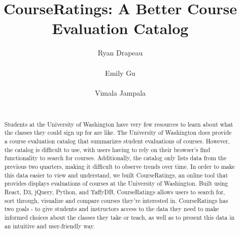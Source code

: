 \documentclass{chi2009}
\begin{document}
\setlength{\paperheight}{11in}
\setlength{\paperwidth}{8.5in}
\setlength{\pdfpageheight}{\paperheight}
\setlength{\pdfpagewidth}{\paperwidth}


\title{CourseRatings: A Better Course Evaluation Catalog}
\author{
  \alignauthor Ryan Drapeau\\
    \\
  \alignauthor Emily Gu\\
    \\
  \alignauthor Vimala Jampala\\
    \\
}

\maketitle

\begin{abstract}
Students at the University of Washington have very few resources to learn about what the classes they could sign up for are like. The University of Washington does provide a course evaluation catalog that summarizes student evaluations of courses. However, the catalog is difficult to use, with users having to rely on their browser's find functionality to search for courses. Additionally, the catalog only lists data from the previous two quarters, making it difficult to observe trends over time. In order to make this data easier to view and understand, we built CourseRatings, an online tool that provides displays evaluations of courses at the University of Washington. Built using React, D3, jQuery, Python, and TaffyDB, CourseRatings allows users to search for, sort through, visualize and compare courses they're interested in. CourseRatings has two goals - to give students and instructors access to the data they need to make informed choices about the classes they take or teach, as well as to present this data in an intuitive and user-friendly way.
\end{abstract}
\end{document}
